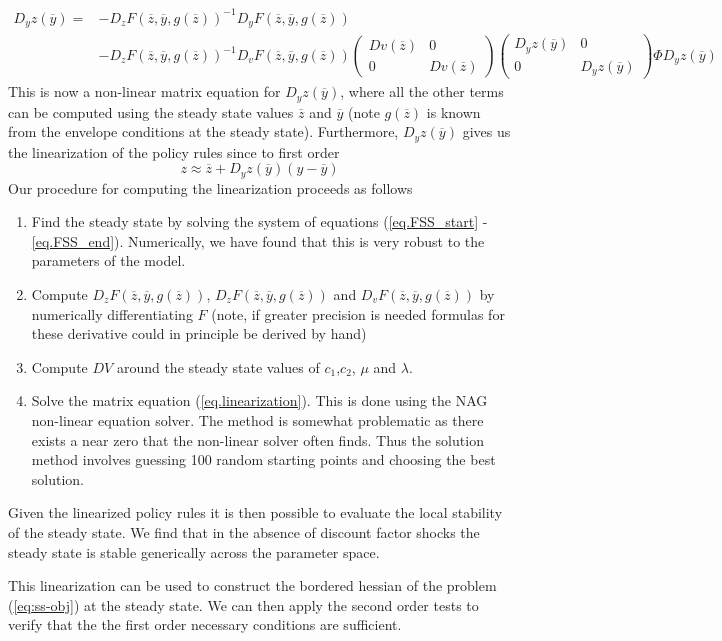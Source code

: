 \documentclass[thmsb,11pt]{article}
\newcommand{\bmat}{\begin{matrix}}
\newcommand{\emat}{\end{matrix}}
\newcommand{\ov}{\overline}
\begin{document}
\begin{align}
	D_y z(\ov y) =& -D_z F(\ov z,\ov y, g(\ov z))^{-1}D_yF(\ov z,\ov y,g(\ov z))\nonumber\\
	& - D_zF(\ov z,\ov y,g(\ov z))^{-1} D_v F(\ov z, \ov y, g(\ov z))\left(\bmat Dv(\ov z) &0\\0& D v(\ov z)\emat\right)\left(\bmat D_y z(\ov y) &0\\0&D_y z(\ov y)\emat\right)\Phi D_y z(\ov y) \label{eq.linearization}
\end{align}  This is now a non-linear matrix equation for $D_y z(\ov y)$,  where all the other terms can be computed using the steady state values $\ov z$ and $\ov y$ (note $g(\ov z)$ is known from the envelope conditions at the steady state).  Furthermore, $D_y z(\ov y)$ gives us the linearization of the policy rules since to first order
\[
	z \approx \ov z + D_y z(\ov y)(y-\ov y)
\]Our procedure for computing the linearization proceeds as follows
	\begin{enumerate}
		\item Find the steady state by solving the system of equations (\ref{eq.FSS_start} - \ref{eq.FSS_end}).  Numerically, we have found that this is very robust to the parameters of the model.
		\item  Compute $D_zF(\ov z,\ov y,g(\ov z))$, $D_zF(\ov z,\ov y,g(\ov z))$ and $D_vF(\ov z,\ov y,g(\ov z))$ by numerically differentiating $F$ (note, if greater precision is needed formulas for these derivative could in principle be derived by hand)
		\item  Compute $DV$ around the steady state values of $c_1$,$c_2$, $\mu$ and $\lambda$.
		\item  Solve the matrix equation (\ref{eq.linearization}).  This is done using the NAG non-linear equation solver.   The method is somewhat problematic as there exists a near zero that the non-linear solver often finds.  Thus the solution method involves guessing 100 random starting points and choosing the best solution.
	\end{enumerate}
Given the linearized policy rules it is then possible to evaluate the local stability of the steady state.  We find that in the absence of discount factor shocks the steady state is stable generically across the parameter space.

This linearization can be used to construct the bordered hessian of the problem (\ref{eq:ss-obj}) at the steady state. We can then apply the second order tests to verify that the the first order necessary conditions are sufficient.
\end{document}
